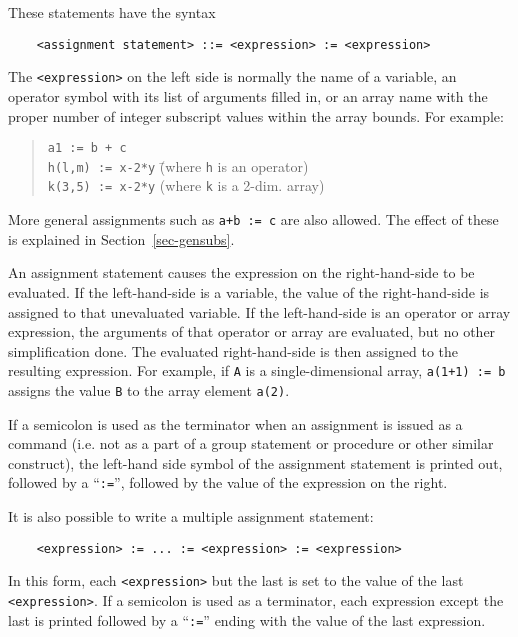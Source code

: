 These statements have the syntax
\begin{verbatim}
    <assignment statement> ::= <expression> := <expression>
\end{verbatim}
The {\tt <expression>} on the left side is normally the name of a variable, an
operator symbol with its list of arguments filled in, or an array name with
the proper number of integer subscript values within the array bounds. For
example:
\begin{quote}
\begin{tabbing}
{\tt a1 := b + c} \\
{\tt h(l,m) := x-2*y} \hspace{1in} \= (where {\tt h} is an operator) \\
{\tt k(3,5) := x-2*y} \> (where {\tt k} is a 2-dim. array)
\end{tabbing}
\end{quote}
More general assignments such as {\tt a+b := c} are also
allowed.  The effect of these is explained in Section~\ref{sec-gensubs}.

An assignment statement causes the expression on the right-hand-side to be
evaluated.  If the left-hand-side is a variable, the value of the
right-hand-side is assigned to that unevaluated variable.  If the
left-hand-side is an operator or array expression, the arguments of that
operator or array are evaluated, but no other simplification done.  The
evaluated right-hand-side is then assigned to the resulting expression.
For example, if {\tt A} is a single-dimensional array, {\tt a(1+1) := b}
assigns the value {\tt B} to the array element {\tt a(2)}.

If a semicolon is used as the terminator when an assignment
 is issued as a command (i.e. not as a part of a group
statement or procedure or other similar construct), the left-hand side
symbol of the assignment statement is printed out, followed by a
``{\tt :=}'', followed by the value of the expression on the right.

It is also possible to write a multiple assignment statement:
\begin{verbatim}
    <expression> := ... := <expression> := <expression>
\end{verbatim}
In this form, each {\tt <expression>} but the last is set to the value of
the last {\tt <expression>}.  If a semicolon is used as a terminator, each
expression except the last is printed followed by a ``{\tt :=}'' ending
with the value of the last expression.


